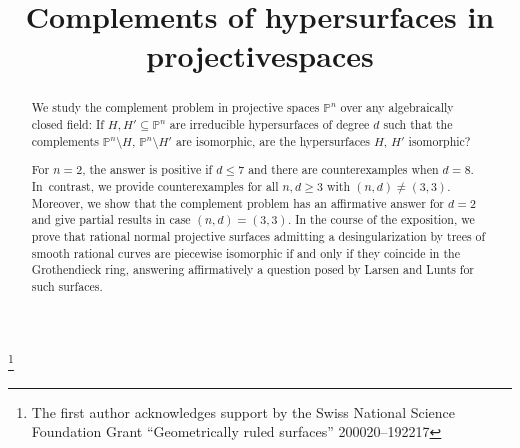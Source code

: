 \documentclass[JEP,XML,SOM,Unicode,NoFloatCountersInSection,published]{cedram}
\theoremstyle{definition}
\begin{document}
\frontmatter

\title{Complements of hypersurfaces in projective\nobreakspace spaces}

\author[\initial{J.} \lastname{Blanc}]{ }
\address{Universität Basel, Departement Mathematik und Informatik,\\
Spiegelgasse 1, CH-4051 Basel, Switzerland}

\author[\initial{P.-M.} \lastname{Poloni}]{ }
\address{Universität Basel, Departement Mathematik und Informatik,\\
Spiegelgasse 1, CH-4051 Basel, Switzerland}

\author[\initial{I.} \lastname{Van Santen}]{\nobreakauthor {}}
\address{Universität Basel, Departement Mathematik und Informatik,\\
Spiegelgasse 1, CH-4051 Basel, Switzerland}

\thanks{The first author acknowledges support by the Swiss National Science Foundation Grant ``Geometrically ruled surfaces'' 200020--192217}

\begin{abstract}
We study the complement problem in projective spaces $\mathbb{P}^n$ over any algebraically closed field: If $H, H' \subseteq \mathbb{P}^n$ are irreducible hypersurfaces of degree $d$ such that the complements $\mathbb{P}^n \setminus H$, $\mathbb{P}^n \setminus H'$ are isomorphic, are the hypersurfaces $H$, $H'$ isomorphic?

For $n = 2$, the answer is positive if $d\leq 7$ and there are counterexamples when $d = 8$. In~contrast, we provide counterexamples for all $n, d \geq 3$ with $(n, d) \neq (3, 3)$. Moreover, we show that the complement problem has an affirmative answer for $d = 2$ and give partial results in case $(n, d) = (3, 3)$. In the course of the exposition, we prove that rational normal projective surfaces admitting a desingularization by trees of smooth rational curves are piecewise isomorphic if and only if they coincide in the Grothendieck ring, answering affirmatively a question posed by Larsen and Lunts for such surfaces.
\end{abstract}
\end{document}
